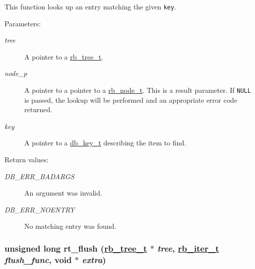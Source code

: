 This function looks up an entry matching the given {\tt key}.\begin{Desc}
\item[Parameters: ]\par
\begin{description}
\item[{\em 
tree}]A pointer to a \hyperlink{group__dbprim__rbtree_a0}{rb\_\-tree\_\-t}. \item[{\em 
node\_\-p}]A pointer to a pointer to a \hyperlink{group__dbprim__rbtree_a1}{rb\_\-node\_\-t}. This is a result parameter. If {\tt NULL} is passed, the lookup will be performed and an appropriate error code returned. \item[{\em 
key}]A pointer to a \hyperlink{group__dbprim_a0}{db\_\-key\_\-t} describing the item to find.\end{description}
\end{Desc}
\begin{Desc}
\item[Return values: ]\par
\begin{description}
\item[{\em 
DB\_\-ERR\_\-BADARGS}]An argument was invalid. \item[{\em 
DB\_\-ERR\_\-NOENTRY}]No matching entry was found. \end{description}
\end{Desc}
\hypertarget{group__dbprim__rbtree_a12}{
\subsubsection[rt\_\-flush]{\setlength{\rightskip}{0pt plus 5cm}unsigned long rt\_\-flush (\hyperlink{group__dbprim__rbtree_a0}{rb\_\-tree\_\-t} $\ast$ {\em tree}, \hyperlink{group__dbprim__rbtree_a2}{rb\_\-iter\_\-t} {\em flush\_\-func}, void $\ast$ {\em extra})}}
\label{group__dbprim__rbtree_a12}


